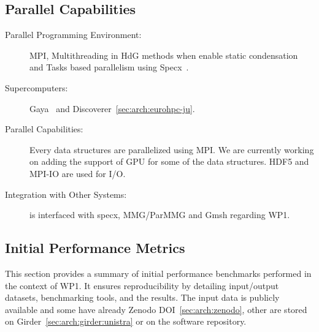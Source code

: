 \subsection{Parallel Capabilities}
\label{sec:WP1:Feelpp:performances}


\begin{description}
    \item[Parallel Programming Environment:]  MPI, Multithreading in HdG methods when enable static condensation and Tasks based parallelism using Specx~\cite{cardosi_specx_2023}.
    \item[Supercomputers:] Gaya~ and Discoverer~\cref{sec:arch:eurohpc-ju}.
    \item[Parallel Capabilities:] Every data structures are parallelized using MPI. We are currently working on adding the support of GPU for some of the data structures. HDF5 and MPI-IO are used for I/O.
    \item[Integration with Other Systems:] \Feelpp is interfaced with specx, MMG/ParMMG and Gmsh regarding WP1.
\end{description}



\subsection{Initial Performance Metrics}
\label{sec:WP1:Feelpp:metrics}

This section provides a summary of initial performance benchmarks performed in the context of WP1.
It ensures reproducibility by detailing input/output datasets, benchmarking tools, and the results.
The input data is publicly available and some have already Zenodo DOI~\cref{sec:arch:zenodo}, other are stored on Girder~\cref{sec:arch:girder:unistra} or on the software repository.

